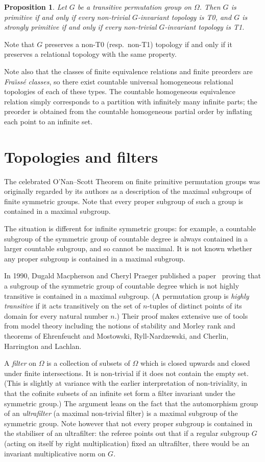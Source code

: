 \documentclass[12pt]{article}
\newtheorem{prop}[theorem]{Proposition}
\begin{document}
\begin{prop}
Let $G$ be a transitive permutation group on $\Omega$. Then $G$ is primitive
if and only if every non-trivial $G$-invariant topology is T0, and $G$ is
strongly primitive if and only if every non-trivial $G$-invariant topology
is T1.
\end{prop}

Note that $G$ preserves a non-T0 (resp.~non-T1) topology if and only if it
preserves a relational topology with the same property.

Note also that the classes of finite equivalence relations and finite preorders
are \emph{Fra\"{\i}ss\'e classes}, so there exist countable universal 
homogeneous relational topologies of each of these types. The countable
homogeneous equivalence relation simply corresponds to a partition with
infinitely many infinite parts; the preorder is obtained from the countable
homogeneous partial order by inflating each point to an infinite set.

\section{Topologies and filters}

The celebrated O'Nan--Scott Theorem on finite primitive permutation groups
was originally regarded by its authors as a description of the maximal
subgroups of finite symmetric groups. Note that every proper subgroup of such
a group is contained in a maximal subgroup.

The situation is different for infinite symmetric groups: for example, a 
countable subgroup of the symmetric group of countable degree is always
contained in a larger countable subgroup, and so cannot be maximal. It is not
known whether any proper subgroup is contained in a maximal subgroup.

In 1990, Dugald Macpherson and Cheryl Praeger published a paper~\cite{mp}
proving that a subgroup of the symmetric group of countable degree which is
not highly transitive is contained in a maximal subgroup. (A permutation group
is \emph{highly transitive} if it acts transitively on the set of $n$-tuples
of distinct points of its domain for every natural number $n$.) Their proof
makes extensive use of tools from model theory including the notions of 
stability and Morley rank and theorems of Ehrenfeucht and Mostowski,
Ryll-Nardzewski, and Cherlin, Harrington and Lachlan. 

A \emph{filter} on $\Omega$ is a collection of subsets of $\Omega$ which is
closed upwards and closed under finite intersections. It is non-trivial
if it does not contain the empty set. (This is slightly at variance with the
earlier interpretation of non-triviality, in that the cofinite subsets of an
infinite set form a filter invariant under the symmetric group.) The argument
leans on the fact that the automorphism group of an \emph{ultrafilter} (a
maximal non-trivial filter) is a maximal subgroup of the symmetric group. Note
however that not every proper subgroup is contained in the stabiliser of an
ultrafilter: the referee points out that if a regular subgroup $G$ (acting on
itself by right multiplication) fixed an ultrafilter, there would be an
invariant multiplicative norm on $G$.
\end{document}
